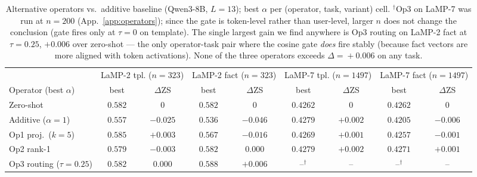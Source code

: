 \documentclass{article}
\begin{document}
\begin{table}[h]
\centering\small
\setlength{\tabcolsep}{4pt}
\begin{tabular}{lcccccccc}
\toprule
            & \multicolumn{2}{c}{LaMP-2 tpl. ($n{=}323$)} & \multicolumn{2}{c}{LaMP-2 fact ($n{=}323$)} & \multicolumn{2}{c}{LaMP-7 tpl. ($n{=}1497$)} & \multicolumn{2}{c}{LaMP-7 fact ($n{=}1497$)} \\
\cmidrule(lr){2-3}\cmidrule(lr){4-5}\cmidrule(lr){6-7}\cmidrule(lr){8-9}
Operator (best $\alpha$)    & best & $\Delta$ZS & best & $\Delta$ZS & best & $\Delta$ZS & best & $\Delta$ZS \\
\midrule
Zero-shot                   & $0.582$ & $0$        & $0.582$ & $0$       & $0.4262$ & $0$        & $0.4262$ & $0$ \\
Additive ($\alpha{=}1$)     & $0.557$ & $-0.025$   & $0.536$ & $-0.046$  & $0.4279$ & $+0.002$   & $0.4205$ & $-0.006$ \\
\midrule
Op1 proj.\ ($k{=}5$)        & $\mathbf{0.585}$ & $+0.003$ & $0.567$ & $-0.016$ & $0.4269$ & $+0.001$ & $0.4257$ & $-0.001$ \\
Op2 rank-1                  & $0.579$ & $-0.003$   & $0.582$ & $0.000$   & $\mathbf{0.4279}$ & $+0.002$ & $\mathbf{0.4271}$ & $+0.001$ \\
Op3 routing ($\tau{=}0.25$) & $0.582$ & $0.000$    & $\mathbf{0.588}$ & $\mathbf{+0.006}$ & --$^\dagger$ & -- & --$^\dagger$ & -- \\
\bottomrule
\end{tabular}
\caption{Alternative operators vs.\ additive baseline (Qwen3-8B,
$L{=}13$); best $\alpha$ per (operator, task, variant) cell.  $^\dagger$Op3 on LaMP-7
was run at $n{=}200$ (App.~\ref{app:operators}); since the gate is
token-level rather than user-level, larger $n$ does not change the
conclusion (gate fires only at $\tau{=}0$ on template). The single
largest gain we find anywhere is Op3 routing on LaMP-2 fact at
$\tau{=}0.25$, $+0.006$ over zero-shot --- the only operator-task
pair where the cosine gate \emph{does} fire stably (because fact
vectors are more aligned with token activations).
None of the three operators exceeds $\Delta\!=\!+0.006$ on any task.}
\label{tab:operators}
\end{table}
\end{document}
